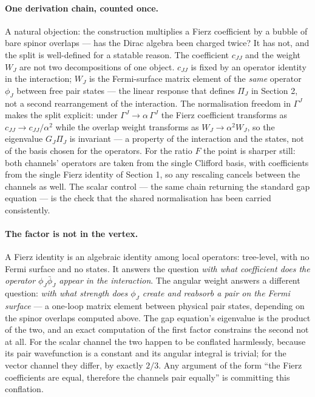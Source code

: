 \documentclass[11pt]{article}
\begin{document}
\paragraph{One derivation chain, counted once.} A natural objection: the construction multiplies a Fierz coefficient by a bubble of bare spinor overlaps --- has the Dirac algebra been charged twice? It has not, and the split is well-defined for a statable reason. The coefficient $c_{JJ}$ and the weight $W_J$ are not two decompositions of one object. $c_{JJ}$ is fixed by an operator identity in the interaction; $W_J$ is the Fermi-surface matrix element of the \emph{same} operator $\phi_J$ between free pair states --- the linear response that defines $\Pi_J$ in Section 2, not a second rearrangement of the interaction. The normalisation freedom in $\Gamma^J$ makes the split explicit: under $\Gamma^J \to \alpha\, \Gamma^J$ the Fierz coefficient transforms as $c_{JJ} \to c_{JJ}/\alpha^2$ while the overlap weight transforms as $W_J \to \alpha^2 W_J$, so the eigenvalue $G_J \Pi_J$ is invariant --- a property of the interaction and the states, not of the basis chosen for the operators. For the ratio $F$ the point is sharper still: both channels' operators are taken from the single Clifford basis, with coefficients from the single Fierz identity of Section 1, so any rescaling cancels between the channels as well. The scalar control --- the same chain returning the standard gap equation --- is the check that the shared normalisation has been carried consistently.

\paragraph{The factor is not in the vertex.} A Fierz identity is an algebraic identity among local operators: tree-level, with no Fermi surface and no states. It answers the question \emph{with what coefficient does the operator $\phi_J \bar\phi_J$ appear in the interaction}. The angular weight answers a different question: \emph{with what strength does $\phi_J$ create and reabsorb a pair on the Fermi surface} --- a one-loop matrix element between physical pair states, depending on the spinor overlaps computed above. The gap equation's eigenvalue is the product of the two, and an exact computation of the first factor constrains the second not at all. For the scalar channel the two happen to be conflated harmlessly, because its pair wavefunction is a constant and its angular integral is trivial; for the vector channel they differ, by exactly $2/3$. Any argument of the form ``the Fierz coefficients are equal, therefore the channels pair equally'' is committing this conflation.
\end{document}
